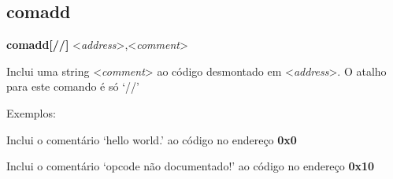 \documentclass[letterpaper,10pt,brazil]{sphinxmanual}
\begin{document}
\subsection{comadd}
\label{debugger/annotation:debugger-command-comadd}\label{debugger/annotation:comadd}
\begin{DUlineblock}{0em}
\item[]
\begin{DUlineblock}{\DUlineblockindent}
\item[] \textbf{comadd{[}//{]}} \textless{}\emph{address}\textgreater{},\textless{}\emph{comment}\textgreater{}
\item[] 
\end{DUlineblock}
\item[] Inclui uma string \textless{}\emph{comment}\textgreater{} ao código desmontado em \textless{}\emph{address}\textgreater{}. O atalho para este comando é só `//'
\item[] 
\item[] Exemplos:
\item[] 
\item[]
\begin{DUlineblock}{\DUlineblockindent}
\item[] 
\item[] 
\end{DUlineblock}
\item[] Inclui o comentário `hello world.' ao código no endereço \textbf{0x0}
\item[] 
\item[]
\begin{DUlineblock}{\DUlineblockindent}
\item[] 
\item[] 
\end{DUlineblock}
\item[] Inclui o comentário `opcode não documentado!' ao código no endereço \textbf{0x10}
\end{DUlineblock}
\begin{quote}
\label{debugger/annotation:debugger-command-comdelete}\end{quote}
\end{document}
